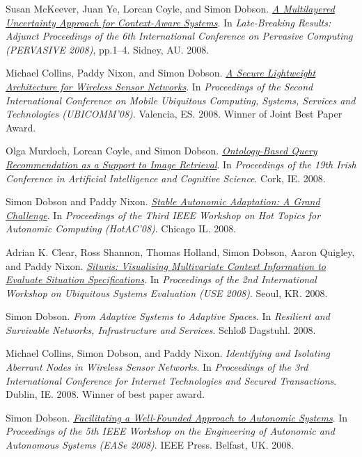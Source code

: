 \documentclass[11pt]{article}
\begin{document}
\label{org77a2e35}Susan McKeever, Juan Ye, Lorcan Coyle, and Simon Dobson.  \emph{\href{https://simondobson.org/softcopy/multilayered-uncertainty-08.pdf}{A Multilayered Uncertainty Approach for Context-Aware Systems}}. In \emph{Late-Breaking Results: Adjunct Proceedings of the 6th International Conference on Pervasive Computing (PERVASIVE 2008)}, pp.1–4. Sidney, AU. 2008.

\label{orgea6e5c2}Michael Collins, Paddy Nixon, and Simon Dobson.  \emph{\href{https://simondobson.org/softcopy/msecurity-ubicom08.pdf}{A Secure Lightweight Architecture for Wireless Sensor Networks}}. In \emph{Proceedings of the Second International Conference on Mobile Ubiquitous Computing, Systems, Services and Technologies (UBICOMM’08)}. Valencia, ES. 2008. Winner of Joint Best Paper Award.

\label{orgad2b550}Olga Murdoch, Lorcan Coyle, and Simon Dobson.  \emph{\href{https://simondobson.org/softcopy/Murdoch2008Ontology.pdf}{Ontology-Based Query Recommendation as a Support to Image Retrieval}}. In \emph{Proceedings of the 19th Irish Conference in Artificial Intelligence and Cognitive Science}. Cork, IE. 2008.

\label{org5416e27}Simon Dobson and Paddy Nixon.  \emph{\href{https://simondobson.org/softcopy/hotac-08.pdf}{Stable Autonomic Adaptation: A Grand Challenge}}. In \emph{Proceedings of the Third IEEE Workshop on Hot Topics for Autonomic Computing (HotAC’08)}. Chicago IL. 2008.

\label{org316280b}Adrian K. Clear, Ross Shannon, Thomas Holland, Simon Dobson, Aaron Quigley, and Paddy Nixon.  \emph{\href{https://simondobson.org/softcopy/situvis.pdf}{Situvis: Visualising Multivariate Context Information to Evaluate Situation Specifications}}. In \emph{Proceedings of the 2nd International Workshop on Ubiquitous Systems Evaluation (USE 2008)}. Seoul, KR. 2008.

\label{orgebddc06}Simon Dobson.  \emph{From Adaptive Systems to Adaptive Spaces}. In \emph{Resilient and Survivable Networks, Infrastructure and Services}. Schloß Dagstuhl. 2008.

\label{orga4a2d2b}Michael Collins, Simon Dobson, and Paddy Nixon.  \emph{Identifying and Isolating Aberrant Nodes in Wireless Sensor Networks}. In \emph{Proceedings of the 3rd International Conference for Internet Technologies and Secured Transactions}. Dublin, IE. 2008. Winner of best paper award.

\label{org0e79ff2}Simon Dobson.  \emph{\href{https://simondobson.org/softcopy/semantics-wg-ease-08.pdf}{Facilitating a Well-Founded Approach to Autonomic Systems}}. In \emph{Proceedings of the 5th IEEE Workshop on the Engineering of Autonomic and Autonomous Systems (EASe 2008)}. IEEE Press. Belfast, UK. 2008.
\end{document}
